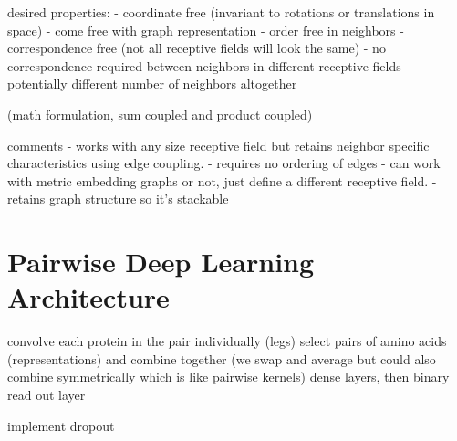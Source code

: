 desired properties:
- coordinate free (invariant to rotations or translations in space) - come free with graph representation
- order free in neighbors
- correspondence free (not all receptive fields will look the same)
	- no correspondence required between neighbors in different receptive fields
	- potentially different number of neighbors altogether
	
(math formulation, sum coupled and product coupled)

comments
- works with any size receptive field but retains neighbor specific characteristics using edge coupling.
- requires no ordering of edges
- can work with metric embedding graphs or not, just define a different receptive field. 
- retains graph structure so it's stackable

\section{Pairwise Deep Learning Architecture}
convolve each protein in the pair individually (legs)
select pairs of amino acids (representations) and combine together (we swap and average but could also combine symmetrically which is like pairwise kernels)
dense layers, then binary read out layer

implement dropout